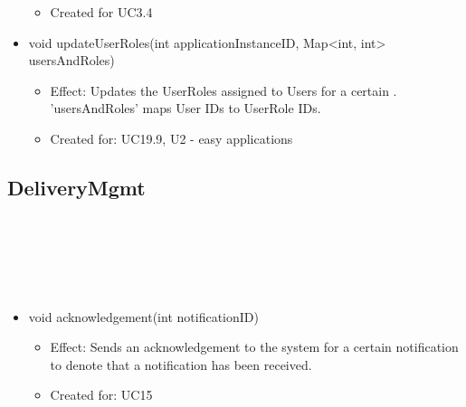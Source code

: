 \begin{description}
\begin{itemize}[noitemsep,nolistsep,leftmargin=-.25cm]
\begin{itemize}[noitemsep,nolistsep]
\item Created for UC3.4
        \end{itemize}
      \item \textsf{void updateUserRoles(int applicationInstanceID, Map\textless{}int, int\textgreater{} usersAndRoles)}
        \begin{itemize}[noitemsep,nolistsep]
           \item Effect: Updates the UserRoles assigned to Users for a certain . 'usersAndRoles' maps User IDs to UserRole IDs.
\item Created for: UC19.9, U2 - easy applications
        \end{itemize}
    \end{itemize}
    \end{description}

  \subsection{DeliveryMgmt}\label{int:OnlineServiceOnlineServiceNotificationHandlerDeliveryMgmt}
    \begin{description}
      \item[Provided by:] \iconcomponent{}~
      \item[Required by:] \iconcomponent{}~
      \item[Operations:] ~
    \begin{itemize}[noitemsep,nolistsep,leftmargin=-.25cm]
      \item \textsf{void acknowledgement(int notificationID)}
        \begin{itemize}[noitemsep,nolistsep]
           \item Effect: Sends an acknowledgement to the system for a certain notification to denote that a notification has been received.
\item Created for: UC15
        \end{itemize}
    \end{itemize}
    \end{description}

